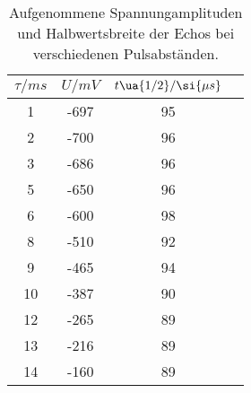 \begin{table}
  \centering
  \caption{Aufgenommene Spannungamplituden und Halbwertsbreite der Echos bei
  verschiedenen Pulsabständen. }
  \label{}
  \begin{tabular}{S  S | S  S}
    \toprule
    {$\tau / \si{ms}$} & {$U / \si{mV}$} & {$t\ua{1/2} / \si{\mu s}$} \\
      & -697 & 95 \\
    2  & -700 & 96 \\
    3  & -686 & 96 \\
    5  & -650 & 96 \\
    6  & -600 & 98 \\
    8  & -510 & 92 \\
    9  & -465 & 94 \\
    10 & -387 & 90 \\
    12 & -265 & 89 \\
    13 & -216 & 89 \\
    14 & -160 & 89
    \bottomrule
  \end{tabular}
\end{table}
